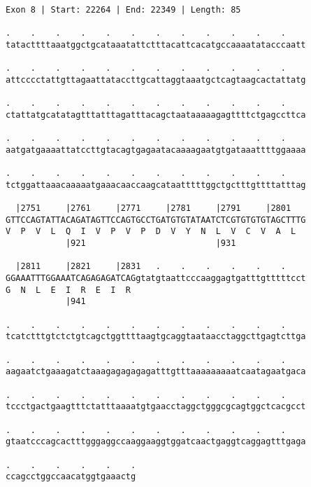 \documentclass{article}
\begin{document}
\newpage
\begin{Verbatim}[fontfamily=courier]
Exon 8 | Start: 22264 | End: 22349 | Length: 85

.    .    .    .    .    .    .    .    .    .    .    .    
tatacttttaaatggctgcataaatattctttacattcacatgccaaaatatacccaatt

.    .    .    .    .    .    .    .    .    .    .    .    
attcccctattgttagaattataccttgcattaggtaaatgctcagtaagcactattatg

.    .    .    .    .    .    .    .    .    .    .    .    
ctattatgcatatagtttatttagatttacagctaataaaaagagttttctgagccttca

.    .    .    .    .    .    .    .    .    .    .    .    
aatgatgaaaattatccttgtacagtgagaatacaaaagaatgtgataaattttggaaaa

.    .    .    .    .    .    .    .    .    .    .    .    
tctggattaaacaaaaatgaaacaaccaagcataatttttggctgctttgttttatttag

  |2751     |2761     |2771     |2781     |2791     |2801   
GTTCCAGTATTACAGATAGTTCCAGTGCCTGATGTGTATAATCTCGTGTGTGTAGCTTTG
V  P  V  L  Q  I  V  P  V  P  D  V  Y  N  L  V  C  V  A  L  
            |921                          |931              

  |2811     |2821     |2831   .    .    .    .    .    .    
GGAAATTTGGAAATCAGAGAGATCAGgtatgtaattcccaaggagtgatttgtttttcct
G  N  L  E  I  R  E  I  R                                   
            |941                                            

.    .    .    .    .    .    .    .    .    .    .    .    
tcatctttgtctctgtcagctggttttaagtgcaggtaataacctaggcttgagtcttga

.    .    .    .    .    .    .    .    .    .    .    .    
aagaatctgaaagatctaaagagagagagatttgtttaaaaaaaaatcaatagaatgaca

.    .    .    .    .    .    .    .    .    .    .    .    
tccctgactgaagtttctatttaaaatgtgaacctaggctgggcgcagtggctcacgcct

.    .    .    .    .    .    .    .    .    .    .    .    
gtaatcccagcactttgggaggccaaggaaggtggatcaactgaggtcaggagtttgaga

.    .    .    .    .    .
ccagcctggccaacatggtgaaactg
\end{Verbatim}
\newpage
\end{document}
